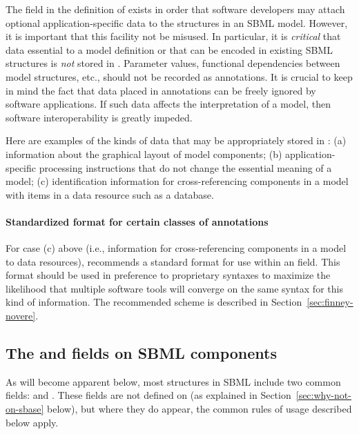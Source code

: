 The  field in the definition of \SBase exists in
order that software developers may attach optional
application-specific data to the structures in an SBML model.
However, it is important that this facility not be misused.  In
particular, it is \emph{critical} that data essential to a model
definition or that can be encoded in existing SBML structures is
\emph{not} stored in . Parameter values,
functional dependencies between model structures, etc., should not
be recorded as annotations.  It is crucial to keep in mind the
fact that data placed in annotations can be freely ignored by
software applications.  If such data affects the interpretation of
a model, then software interoperability is greatly impeded.

Here are examples of the kinds of data that may be appropriately
stored in : (a) information about the graphical
layout of model components; (b) application-specific processing
instructions that do not change the essential meaning of a model;
(c) identification information for cross-referencing components in
a model with items in a data resource such as a database.


\paragraph{Standardized format for certain classes of annotations}

For case (c) above (i.e., information for cross-referencing
components in a model to data resources), \sbmltwotwo recommends a
standard format for use within an  field.  This
format should be used in preference to proprietary syntaxes to
maximize the likelihood that multiple software tools will converge
on the same syntax for this kind of information.  The \sbmltwotwo
recommended scheme is described in
Section~\ref{sec:finney-novere}.


\subsection{The  and  fields on SBML components}
\label{sec:idnameattribs}

As will become apparent below, most structures in SBML include two
common fields:  and .  These fields are not
defined on \SBase (as explained in
Section~\ref{sec:why-not-on-sbase} below), but where they do
appear, the common rules of usage described below apply.


